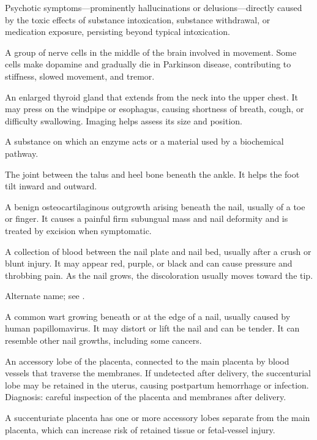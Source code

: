  Psychotic symptoms—prominently hallucinations or delusions—directly caused by the toxic effects of substance intoxication, substance withdrawal, or medication exposure, persisting beyond typical intoxication.

 A group of nerve cells in the middle of the brain involved in movement. Some cells make dopamine and gradually die in Parkinson disease, contributing to stiffness, slowed movement, and tremor.

 An enlarged thyroid gland that extends from the neck into the upper chest. It may press on the windpipe or esophagus, causing shortness of breath, cough, or difficulty swallowing. Imaging helps assess its size and position.

 A substance on which an enzyme acts or a material used by a biochemical pathway.

 The joint between the talus and heel bone beneath the ankle. It helps the foot tilt inward and outward.

 A benign osteocartilaginous outgrowth arising beneath the nail, usually of a toe or finger. It causes a painful firm subungual mass and nail deformity and is treated by excision when symptomatic.

 A collection of blood between the nail
  plate and nail bed, usually after a crush or blunt injury. It may
  appear red, purple, or black and can cause pressure and throbbing pain.
  As the nail grows, the discoloration usually moves toward the tip.

 Alternate name; see
  .

 A common wart growing beneath or at
  the edge of a nail, usually caused by human papillomavirus. It may
  distort or lift the nail and can be tender. It can resemble other
  nail growths, including some cancers.

 An accessory lobe of the placenta, connected to the main placenta by blood vessels that
traverse the membranes. If undetected after delivery, the succenturial lobe may be
retained in the uterus, causing postpartum hemorrhage or infection. Diagnosis: careful
inspection of the placenta and membranes after delivery.

 A succenturiate placenta has one or more accessory lobes separate from the main placenta, which can increase risk of retained tissue or fetal-vessel injury.

